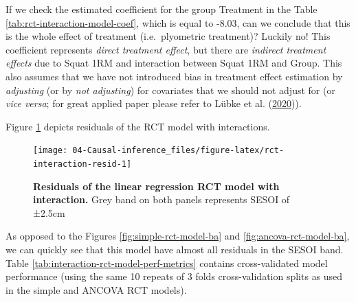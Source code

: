 \documentclass[
]{book}
\begin{document}
If we check the estimated coefficient for the group Treatment in the Table \ref{tab:rct-interaction-model-coef}, which is equal to -8.03, can we conclude that this is the whole effect of treatment (i.e.~plyometric treatment)? Luckily no! This coefficient represents \emph{direct treatment effect}, but there are \emph{indirect treatment effects} due to Squat 1RM and interaction between Squat 1RM and Group. This also assumes that we have not introduced bias in treatment effect estimation by \emph{adjusting} (or by \emph{not adjusting}) for covariates that we should not adjust for (or \emph{vice versa}; for great applied paper please refer to Lübke et al. (\protect\hyperlink{ref-lubkeWhyWeShould2020}{2020})).

Figure \ref{fig:rct-interaction-resid} depicts residuals of the RCT model with interactions.

\begin{figure}

{\centering \texttt{[image: 04-Causal-inference\_files/figure-latex/rct-interaction-resid-1]} 

}

\caption{\textbf{Residuals of the linear regression RCT model with interaction. }Grey band on both panels represents SESOI of ±2.5cm}\label{fig:rct-interaction-resid}
\end{figure}



As opposed to the Figures \ref{fig:simple-rct-model-ba} and \ref{fig:ancova-rct-model-ba}, we can quickly see that this model have almost all residuals in the SESOI band. Table \ref{tab:interaction-rct-model-perf-metrics} contains cross-validated model performance (using the same 10 repeats of 3 folds cross-validation splits as used in the simple and ANCOVA RCT models).
\end{document}
